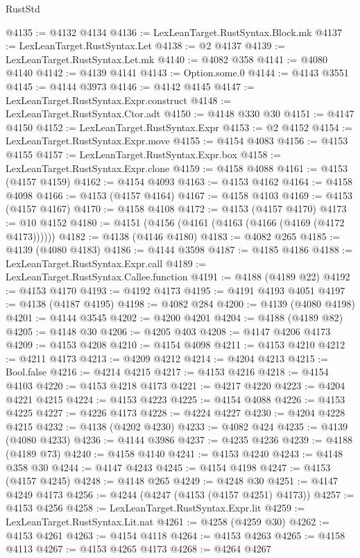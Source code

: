 \begin{lexlean}{RustStd}
\begin{coremodule}
@4135 := @4132 @4134
@4136 := LexLeanTarget.RustSyntax.Block.mk
@4137 := LexLeanTarget.RustSyntax.Let
@4138 := @2 @4137
@4139 := LexLeanTarget.RustSyntax.Let.mk
@4140 := @4082 @358
@4141 := @4080 @4140
@4142 := @4139 @4141
@4143 := Option.some.{0}
@4144 := @4143 @3551
@4145 := @4144 @3973
@4146 := @4142 @4145
@4147 := LexLeanTarget.RustSyntax.Expr.construct
@4148 := LexLeanTarget.RustSyntax.Ctor.adt
@4150 := @4148 @330 @30
@4151 := @4147 @4150
@4152 := LexLeanTarget.RustSyntax.Expr
@4153 := @2 @4152
@4154 := LexLeanTarget.RustSyntax.Expr.move
@4155 := @4154 @4083
@4156 := @4153 @4155
@4157 := LexLeanTarget.RustSyntax.Expr.box
@4158 := LexLeanTarget.RustSyntax.Expr.clone
@4159 := @4158 @4088
@4161 := @4153 (@4157 @4159)
@4162 := @4154 @4093
@4163 := @4153 @4162
@4164 := @4158 @4098
@4166 := @4153 (@4157 @4164)
@4167 := @4158 @4103
@4169 := @4153 (@4157 @4167)
@4170 := @4158 @4108
@4172 := @4153 (@4157 @4170)
@4173 := @10 @4152
@4180 := @4151 (@4156 (@4161 (@4163 (@4166 (@4169 (@4172 @4173))))))
@4182 := @4138 (@4146 @4180)
@4183 := @4082 @265
@4185 := @4139 (@4080 @4183)
@4186 := @4144 @3598
@4187 := @4185 @4186
@4188 := LexLeanTarget.RustSyntax.Expr.call
@4189 := LexLeanTarget.RustSyntax.Callee.function
@4191 := @4188 (@4189 @22)
@4192 := @4153 @4170
@4193 := @4192 @4173
@4195 := @4191 @4193 @4051
@4197 := @4138 (@4187 @4195)
@4198 := @4082 @284
@4200 := @4139 (@4080 @4198)
@4201 := @4144 @3545
@4202 := @4200 @4201
@4204 := @4188 (@4189 @82)
@4205 := @4148 @30
@4206 := @4205 @403
@4208 := @4147 @4206 @4173
@4209 := @4153 @4208
@4210 := @4154 @4098
@4211 := @4153 @4210
@4212 := @4211 @4173
@4213 := @4209 @4212
@4214 := @4204 @4213
@4215 := Bool.false
@4216 := @4214 @4215
@4217 := @4153 @4216
@4218 := @4154 @4103
@4220 := @4153 @4218 @4173
@4221 := @4217 @4220
@4223 := @4204 @4221 @4215
@4224 := @4153 @4223
@4225 := @4154 @4088
@4226 := @4153 @4225
@4227 := @4226 @4173
@4228 := @4224 @4227
@4230 := @4204 @4228 @4215
@4232 := @4138 (@4202 @4230)
@4233 := @4082 @424
@4235 := @4139 (@4080 @4233)
@4236 := @4144 @3986
@4237 := @4235 @4236
@4239 := @4188 (@4189 @73)
@4240 := @4158 @4140
@4241 := @4153 @4240
@4243 := @4148 @358 @30
@4244 := @4147 @4243
@4245 := @4154 @4198
@4247 := @4153 (@4157 @4245)
@4248 := @4148 @265
@4249 := @4248 @30
@4251 := @4147 @4249 @4173
@4256 := @4244 (@4247 (@4153 (@4157 @4251) @4173))
@4257 := @4153 @4256
@4258 := LexLeanTarget.RustSyntax.Expr.lit
@4259 := LexLeanTarget.RustSyntax.Lit.nat
@4261 := @4258 (@4259 @30)
@4262 := @4153 @4261
@4263 := @4154 @4118
@4264 := @4153 @4263
@4265 := @4158 @4113
@4267 := @4153 @4265 @4173
@4268 := @4264 @4267

\end{coremodule}
\end{lexlean}
